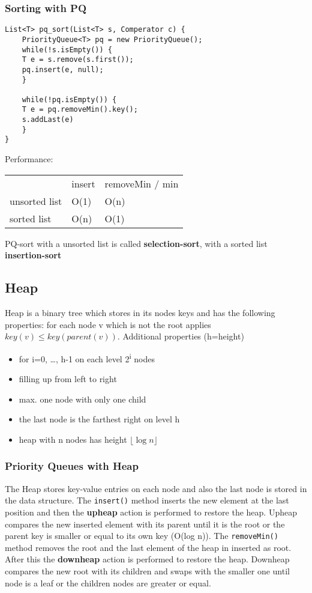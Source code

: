 \documentclass[11pt,twoside,landscape]{article}
\begin{document}
\begin{multicols}{2}
\subsubsection*{Sorting with PQ}
\label{sec:orgc6fe52f}
\begin{verbatim}
List<T> pq_sort(List<T> s, Comperator c) {
    PriorityQueue<T> pq = new PriorityQueue();
    while(!s.isEmpty()) {
	T e = s.remove(s.first());
	pq.insert(e, null);
    }

    while(!pq.isEmpty()) {
	T e = pq.removeMin().key();
	s.addLast(e)
    }
}
\end{verbatim}

Performance:
\begin{center}
\begin{tabular}{lll}
 & insert & removeMin / min\\
unsorted list & O(1) & O(n)\\
sorted list & O(n) & O(1)\\
\end{tabular}
\end{center}

PQ-sort with a unsorted list is called \textbf{selection-sort}, with a sorted list \textbf{insertion-sort}
\subsection*{Heap}
\label{sec:org5ed3826}
Heap is a binary tree which stores in its nodes keys and has the following properties: for each node v which is not the root applies \(key(v) \leq key(parent(v))\). Additional properties (h=height)
\begin{itemize}
\item for i=0, \ldots{}, h-1 on each level 2\textsuperscript{i} nodes
\item filling up from left to right
\item max. one node with only one child
\item the last node is the farthest right on level h
\item heap with n nodes has height \(\lfloor \log n \rfloor\)
\end{itemize}


\subsubsection*{Priority Queues with Heap}
\label{sec:org992f780}
The Heap stores key-value entries on each node and also the last node is stored in the data structure. The \texttt{insert()} method inserts the new element at the last position and then the \textbf{upheap} action is performed to restore the heap. Upheap compares the new inserted element with its parent until it is the root or the parent key is smaller or equal to its own key (O(log n)). The \texttt{removeMin()} method removes the root and the last element of the heap in inserted as root. After this the \textbf{downheap} action is performed to restore the heap. Downheap compares the new root with its children and swaps with the smaller one until node is a leaf or the children nodes are greater or equal.


\end{multicols}
\end{document}
